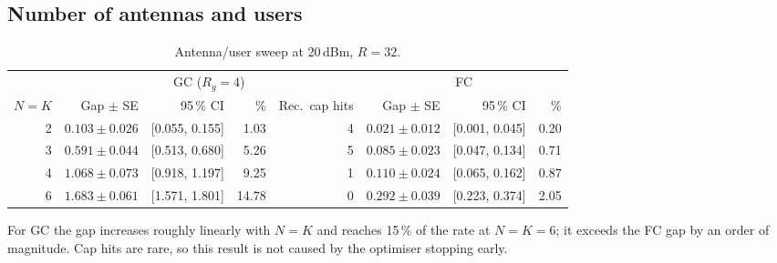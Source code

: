 \documentclass[10pt,a4paper]{article}
\begin{document}
\subsection{Number of antennas and users}
\begin{table}[H]\centering\small
\begin{tabular}{@{}rrrrrrrr@{}}\toprule
 & \multicolumn{4}{c}{GC ($R_g{=}4$)} & \multicolumn{3}{c}{FC}\\\cmidrule(lr){2-5}\cmidrule(lr){6-8}
$N{=}K$ & Gap $\pm$ SE & 95\,\% CI & \% & Rec.\ cap hits & Gap $\pm$ SE & 95\,\% CI & \%\\\midrule
2 & $0.103\pm0.026$ & [0.055, 0.155] & 1.03 & 4 & $0.021\pm0.012$ & [0.001, 0.045] & 0.20\\
3 & $0.591\pm0.044$ & [0.513, 0.680] & 5.26 & 5 & $0.085\pm0.023$ & [0.047, 0.134] & 0.71\\
4 & $1.068\pm0.073$ & [0.918, 1.197] & 9.25 & 1 & $0.110\pm0.024$ & [0.065, 0.162] & 0.87\\
6 & $1.683\pm0.061$ & [1.571, 1.801] & 14.78 & 0 & $0.292\pm0.039$ & [0.223, 0.374] & 2.05\\\bottomrule
\end{tabular}
\caption{Antenna/user sweep at 20\,dBm, $R{=}32$.}
\end{table}
For GC the gap increases roughly linearly with $N{=}K$ and reaches 15\,\% of the rate at $N{=}K{=}6$; it exceeds the FC gap by an order of magnitude. Cap hits are rare, so this result is not caused by the optimiser stopping early.
\end{document}
